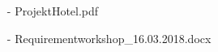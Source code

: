 \documentclass[../../Pflichtenheft.tex]{subfiles}
\begin{document}
	\begin{itemize}
		\item[-] ProjektHotel.pdf
		\item[-] Requirementworkshop_16.03.2018.docx
    \end{itemize}
\end{document}
